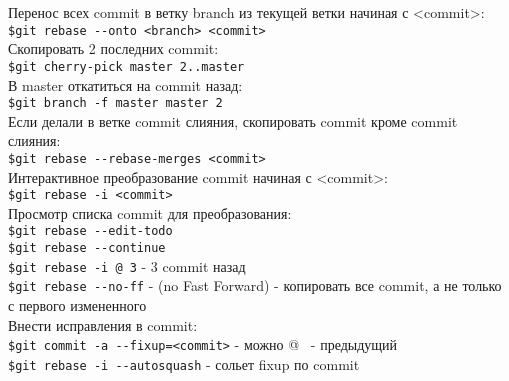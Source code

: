 \noindent Перенос всех commit в ветку branch из текущей ветки начиная с <commit>: \\
\indent \texttt{\$git rebase {-}-onto <branch> <commit>}  \\

\noindent Скопировать 2 последних commit: \\
\indent \texttt{\$git cherry-pick master~2..master \indent} \\
\noindent В master откатиться на commit назад: \\
\indent \texttt{\$git branch -f master master~2} \\

\noindent Если делали в ветке commit слияния, скопировать commit кроме commit слияния: \\
\indent \texttt{\$git rebase {-}-rebase-merges <commit>} \\

\noindent Интерактивное преобразование commit начиная с <commit>: \\
\indent \texttt{\$git rebase -i <commit>}  \\
\noindent Просмотр списка commit для преобразования: \\
\indent \texttt{\$git rebase {-}-edit-todo}  \\

\noindent \texttt{\$git rebase {-}-continue} \\
\noindent \texttt{\$git rebase -i @~3} - 3 commit назад \\
\noindent \texttt{\$git rebase {-}-no-ff}  - (no Fast Forward) - копировать все commit, а не только с первого измененного \\

\noindent Внести исправления в commit: \\
\indent \texttt{\$git commit -a {-}-fixup=<commit>}   - можно @~ - предыдущий \\
\indent \texttt{\$git rebase -i {-}-autosquash} - сольет fixup по commit \\
